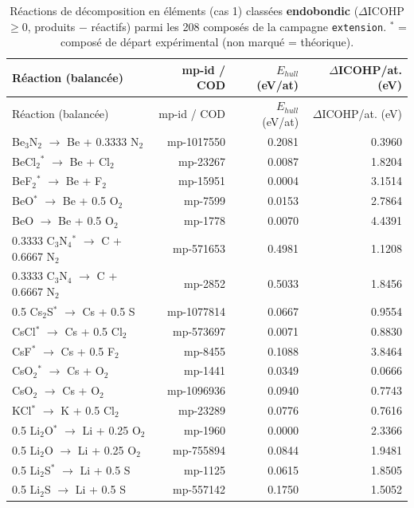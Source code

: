 \begin{longtable}{@{}lrrr@{}}
\caption{Réactions de décomposition en éléments (cas 1) classées \textbf{endobondic} ($\Delta$ICOHP $\geq 0$, produits $-$ réactifs) parmi les 208 composés de la campagne \texttt{extension}. $^*$ = composé de départ expérimental (non marqué = théorique).}\\
\toprule
Réaction (balancée) & mp-id / COD & $E_{hull}$ (eV/at) & $\Delta$ICOHP/at. (eV) \\
\midrule
\endfirsthead
\toprule
Réaction (balancée) & mp-id / COD & $E_{hull}$ (eV/at) & $\Delta$ICOHP/at. (eV) \\
\midrule
\endhead
\bottomrule
\endfoot
0.3333 Be$_{3}$N$_{2}$ $\rightarrow$ Be + 0.3333 N$_{2}$ & mp-1017550 & 0.2081 & 0.3960 \\
BeCl$_{2}$$^*$ $\rightarrow$ Be + Cl$_{2}$ & mp-23267 & 0.0087 & 1.8204 \\
BeF$_{2}$$^*$ $\rightarrow$ Be + F$_{2}$ & mp-15951 & 0.0004 & 3.1514 \\
BeO$^*$ $\rightarrow$ Be + 0.5 O$_{2}$ & mp-7599 & 0.0153 & 2.7864 \\
BeO $\rightarrow$ Be + 0.5 O$_{2}$ & mp-1778 & 0.0070 & 4.4391 \\
0.3333 C$_{3}$N$_{4}$$^*$ $\rightarrow$ C + 0.6667 N$_{2}$ & mp-571653 & 0.4981 & 1.1208 \\
0.3333 C$_{3}$N$_{4}$ $\rightarrow$ C + 0.6667 N$_{2}$ & mp-2852 & 0.5033 & 1.8456 \\
0.5 Cs$_{2}$S$^*$ $\rightarrow$ Cs + 0.5 S & mp-1077814 & 0.0667 & 0.9554 \\
CsCl$^*$ $\rightarrow$ Cs + 0.5 Cl$_{2}$ & mp-573697 & 0.0071 & 0.8830 \\
CsF$^*$ $\rightarrow$ Cs + 0.5 F$_{2}$ & mp-8455 & 0.1088 & 3.8464 \\
CsO$_{2}$$^*$ $\rightarrow$ Cs + O$_{2}$ & mp-1441 & 0.0349 & 0.0666 \\
CsO$_{2}$ $\rightarrow$ Cs + O$_{2}$ & mp-1096936 & 0.0940 & 0.7743 \\
KCl$^*$ $\rightarrow$ K + 0.5 Cl$_{2}$ & mp-23289 & 0.0776 & 0.7616 \\
0.5 Li$_{2}$O$^*$ $\rightarrow$ Li + 0.25 O$_{2}$ & mp-1960 & 0.0000 & 2.3366 \\
0.5 Li$_{2}$O $\rightarrow$ Li + 0.25 O$_{2}$ & mp-755894 & 0.0844 & 1.9481 \\
0.5 Li$_{2}$S$^*$ $\rightarrow$ Li + 0.5 S & mp-1125 & 0.0615 & 1.8505 \\
0.5 Li$_{2}$S $\rightarrow$ Li + 0.5 S & mp-557142 & 0.1750 & 1.5052 \\

\end{longtable}
